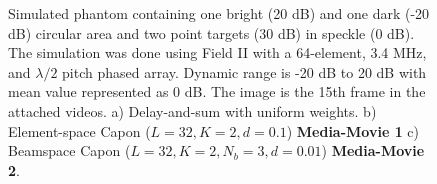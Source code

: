\documentclass[journal]{IEEEtran}
\newcommand\multimedia[1]{\textbf{{\color{red}#1}}}
\begin{document}
\begin{figure}[!t]
\centerline{
\hfil
{}
\hfil
{}
}
\caption{Simulated phantom containing one bright (20 dB) and one dark (-20 dB) circular area and two point targets (30 dB) in speckle (0 dB). The simulation was done using Field II with a 64-element, 3.4 MHz, and $\lambda/2$ pitch phased array. Dynamic range is -20 dB to 20 dB with mean value represented as 0 dB. The image is the 15th frame in the attached videos. a) Delay-and-sum with uniform weights. b) Element-space Capon ($L=32, K=2, d=0.1$) \multimedia{Media-Movie 1} c) Beamspace Capon ($L=32, K=2, N_b=3, d=0.01$) \multimedia{Media-Movie 2}.}
\label{fig:phantom}
\end{figure}
\end{document}
